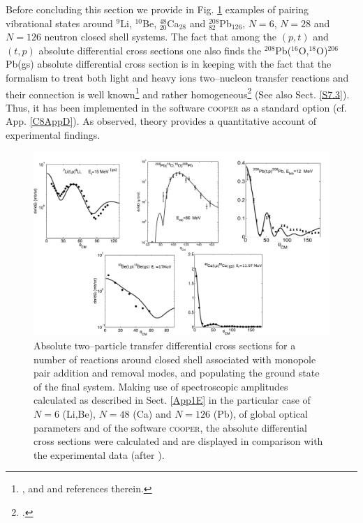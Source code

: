  Before concluding this section we provide in Fig. \ref{fig8_2_1} examples of pairing vibrational states around $^9$Li, $^{10}$Be, $^{48}_{20}$Ca$_{28}$ and $^{208}_{82}$Pb$_{126}$, $N=6$,  $N=28$ and $N=126$ neutron closed shell systems. The fact that among the $(p,t)$ and $(t,p)$ absolute differential cross sections one also finds the $^{208}$Pb($^{16}$O,$^{18}$O)$^{206}$Pb(gs) absolute differential cross section is in keeping with the fact that the formalism to treat both light and heavy ions two--nucleon transfer reactions and their connection is well known\footnote{\cite{Broglia:04a}, \cite{Bayman:82} and  \cite{Thompson:88} and references therein.} and rather homogeneous\footnote{\cite{Potel:13,Potel:13b}.} (See also Sect. \ref{S7.3}). Thus, it has been implemented in the software \textsc{cooper} as a standard option (cf. App. \ref{C8AppD}). As observed, theory provides a quantitative account of experimental findings.
   \begin{figure}
   \centerline{\includegraphics*[width=18cm,angle=0]{C8/figsC8/fig8_1_5}}
   	\caption{Absolute two--particle transfer differential cross sections for a number of reactions around closed shell associated with monopole pair addition and removal modes, and populating the ground state of the final system. Making use of spectroscopic amplitudes calculated as described in Sect. \ref{App1E} in the particular case of $N=6$ (Li,Be), $N=48$ (Ca) and  $N=126$ (Pb), of global optical parameters and of the software \textsc{cooper}, the absolute differential cross sections were calculated and are displayed in comparison with the experimental data (after \cite{Potel:13}).}\label{fig8_2_1}
   \end{figure}
 
 
 
